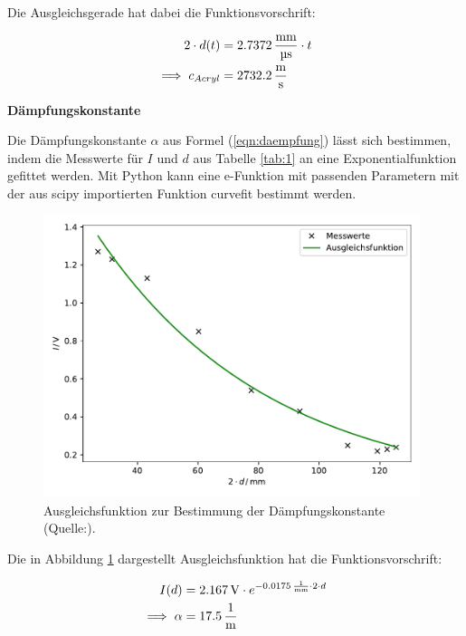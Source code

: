 \noindent
Die Ausgleichsgerade hat dabei die Funktionsvorschrift:

\begin{align*}
2 \cdot d(t) &= 2.7372 \, \si[per-mode=fraction]{\milli\meter\per\micro\second} \cdot t \\
\implies c_{Acryl} &= 2732.2 \, \si[per-mode=fraction]{\meter\per\second} \\
\end{align*}

\noindent
\textbf{Dämpfungskonstante}

\noindent
Die Dämpfungskonstante $\alpha$ aus Formel (\ref{eqn:daempfung}) lässt sich bestimmen, indem die Messwerte für $I$ und $d$ aus Tabelle \ref{tab:1} an eine Exponentialfunktion gefittet werden. %
Mit Python kann eine e-Funktion mit passenden Parametern mit der aus scipy \cite{scipy} importierten Funktion curvefit bestimmt werden.

\begin{figure}
    \centering
    \includegraphics[width=11cm]{Daten/daempf.pdf}
    \caption{Ausgleichsfunktion zur Bestimmung der Dämpfungskonstante (Quelle:\cite{US1}).}
    \label{fig:daempf}
  \end{figure}

  \newpage
\noindent
Die in Abbildung \ref{fig:daempf} dargestellt Ausgleichsfunktion hat die Funktionsvorschrift:

\begin{align*}
I(d) &= 2.167 \, \si{\volt} \cdot e^{-0.0175 \, \si[per-mode=fraction]{\per\milli\meter} \cdot 2 \cdot d}\\
\implies \alpha &= 17.5 \, \si[per-mode=fraction]{\per\meter}\\
\end{align*}


